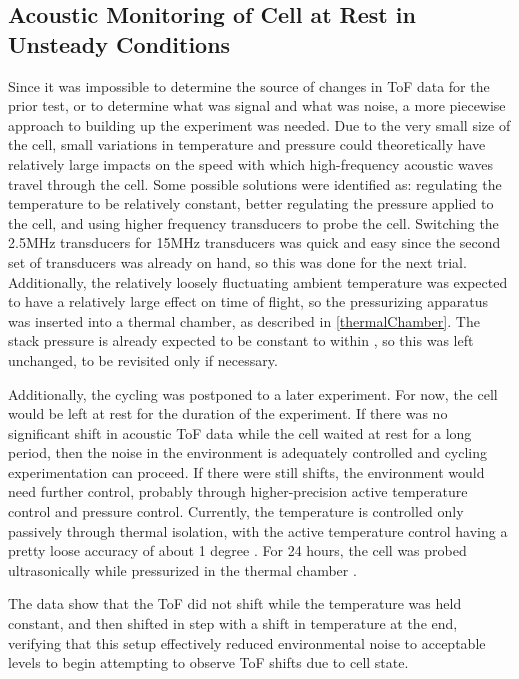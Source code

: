     
\subsection{Acoustic Monitoring of Cell at Rest in Unsteady Conditions}\label{chamberTest}
Since it was impossible to determine the source of changes in ToF data for the prior test, or to determine what was signal and what was noise, a more piecewise approach to building up the experiment was needed. Due to the very small size of the cell, small variations in temperature and pressure could theoretically have relatively large impacts on the speed with which high-frequency acoustic waves travel through the cell. Some possible solutions were identified as: regulating the temperature to be relatively constant, better regulating the pressure applied to the cell, and using higher frequency transducers to probe the cell. Switching the 2.5MHz transducers for 15MHz transducers was quick and easy since the second set of transducers was already on hand, so this was done for the next trial. Additionally, the relatively loosely fluctuating ambient temperature was expected to have a relatively large effect on time of flight, so the pressurizing apparatus was inserted into a thermal chamber, as described in \hyperref[thermalChamber]{\cref{thermalChamber}}. The stack pressure is already expected to be constant to within , so this was left unchanged, to be revisited only if necessary.

Additionally, the cycling was postponed to a later experiment.
For now, the cell would be left at rest for the duration of the experiment. 
If there was no significant shift in acoustic ToF data while the cell waited at rest for a long period, then the noise in the environment is adequately controlled and cycling experimentation can proceed. 
If there were still shifts, the environment would need further control, probably through higher-precision active temperature control and pressure control. 
Currently, the temperature is controlled only passively through thermal isolation, with the active temperature control having a pretty loose accuracy of about 1 degree .
For 24 hours, the cell was probed ultrasonically while pressurized in the thermal chamber .

The data show that the ToF did not shift while the temperature was held constant, and then shifted in step with a shift in temperature at the end, verifying that this setup effectively reduced environmental noise to acceptable levels to begin attempting to observe ToF shifts due to cell state.


